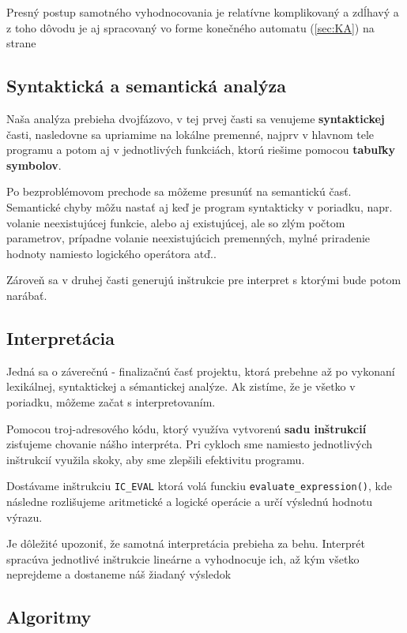 \documentclass[12pt, a4paper]{article}
\begin{document}
        Presný postup samotného vyhodnocovania je relatívne komplikovaný a zdĺhavý a z toho dôvodu je aj spracovaný vo forme konečného automatu (\ref{sec:KA}) na strane \pageref{sec:KA}
        
        \subsection{Syntaktická a semantická analýza}
        Naša analýza prebieha dvojfázovo, v tej prvej časti sa venujeme \textbf{syntaktickej} časti, nasledovne sa upriamime na lokálne premenné, najprv v hlavnom tele programu a potom aj v jednotlivých funkciách, ktorú riešime pomocou \textbf{tabuľky symbolov}. 
        
        Po bezproblémovom prechode sa môžeme presunúť na semantickú časť. Semantické chyby môžu nastať aj keď je program syntakticky v poriadku, napr. volanie neexistujúcej funkcie, alebo aj existujúcej, ale so zlým počtom parametrov, prípadne volanie neexistujúcich premenných, mylné priradenie hodnoty namiesto logického operátora atď.. 
        
        Zároveň sa v druhej časti generujú inštrukcie pre interpret s ktorými bude potom narábať.
        \newpage
        \subsection{Interpretácia}
        Jedná sa o záverečnú - finalizačnú časť projektu, ktorá prebehne až po vykonaní lexikálnej, syntaktickej a sémantickej analýze. Ak zistíme, že je všetko v poriadku, môžeme začat s interpretovaním.
        
        Pomocou troj-adresového kódu, ktorý využíva  vytvorenú \textbf{sadu inštrukcií} zisťujeme chovanie nášho interpréta. Pri cykloch sme namiesto jednotlivých inštrukcií využila skoky, aby sme zlepšili efektivitu programu. 
        
        Dostávame inštrukciu \verb|IC_EVAL| ktorá volá funckiu \verb|evaluate_expression()|, kde následne rozlišujeme aritmetické a logické operácie a určí výslednú hodnotu výrazu. 
        
        Je dôležité upozoniť, že samotná interpretácia prebieha za behu. Interprét spracúva jednotlivé inštrukcie lineárne a vyhodnocuje ich, až kým všetko neprejdeme a dostaneme náš žiadaný výsledok
        
        \subsection{Algoritmy}
\end{document}
